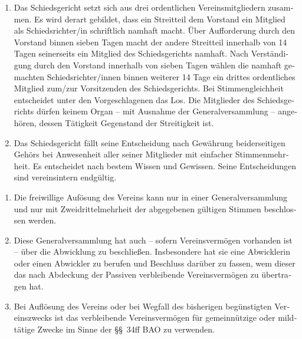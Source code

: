 \begin{otherlanguage}{german}
\begin{enumerate}[statutenenum]
    \item Das Schiedsgericht setzt sich aus drei ordentlichen Vereinsmitgliedern zusammen.
        Es wird derart gebildet, dass ein Streitteil dem Vorstand ein Mitglied als Schiedsrichter/in schriftlich namhaft macht.
        Über Aufforderung durch den Vorstand binnen sieben Tagen macht der andere Streitteil innerhalb von 14 Tagen seinerseits ein Mitglied des Schiedsgerichts namhaft.
        Nach Verständigung durch den Vorstand innerhalb von sieben Tagen wählen die namhaft gemachten Schiedsrichter/innen binnen weiterer 14 Tage ein drittes ordentliches Mitglied zum/zur Vorsitzenden des Schiedsgerichts.
        Bei Stimmengleichheit entscheidet unter den Vorgeschlagenen das Los.
        Die Mitglieder des Schiedsgerichts dürfen keinem Organ -- mit Ausnahme der Generalversammlung -- angehören, dessen Tätigkeit Gegenstand der Streitigkeit ist.

    \item Das Schiedsgericht fällt seine Entscheidung nach Gewährung beiderseitigen Gehörs bei Anwesenheit aller seiner Mitglieder mit einfacher Stimmenmehrheit.
        Es entscheidet nach bestem Wissen und Gewissen.
        Seine Entscheidungen sind vereinsintern endgültig.
\end{enumerate}


\begin{enumerate}[statutenenum]
    \item Die freiwillige Aufösung des Vereins kann nur in einer Generalversammlung und nur mit Zweidrittelmehrheit der abgegebenen gültigen Stimmen beschlossen werden.

    \item Diese Generalversammlung hat auch -- sofern Vereinsvermögen vorhanden ist -- über die Abwicklung zu beschließen.
        Insbesondere hat sie eine Abwicklerin oder einen Abwickler zu berufen und Beschluss darüber zu fassen, wem dieser das nach Abdeckung der Passiven verbleibende Vereinsvermögen zu übertragen hat.

    \item Bei Auflösung des Vereins oder bei Wegfall des bisherigen begünstigten Vereinszwecks ist das verbleibende Vereinsvermögen für gemeinnützige oder mildtätige Zwecke im Sinne der \S\S\ 34ff BAO zu verwenden.
\end{enumerate}

\end{otherlanguage}
